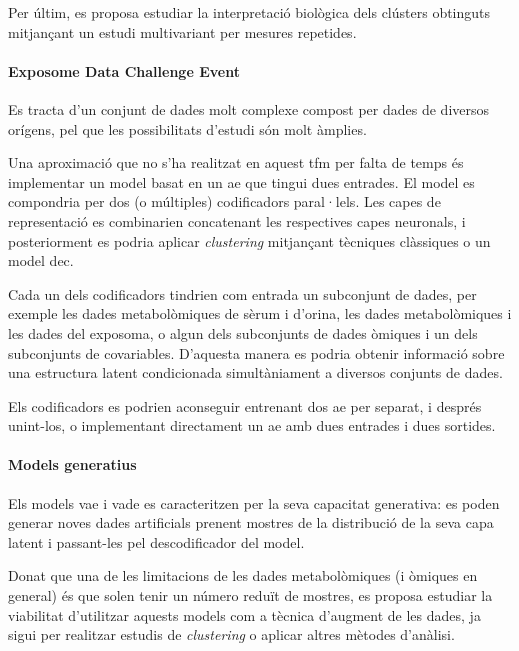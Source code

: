 \documentclass[CAT,BIB]{TFUOC}%
\begin{document}
            Per últim,
            es proposa estudiar la interpretació biològica dels clústers obtinguts
            mitjançant un estudi multivariant per mesures repetides.

        \paragraph{Exposome Data Challenge Event}
            Es tracta d'un conjunt de dades molt complexe
            compost per dades de diversos orígens,
            pel que les possibilitats d'estudi són molt àmplies.

            Una aproximació que no s'ha realitzat en aquest \gls{tfm}
            per falta de temps és
            implementar un model basat en un \gls{ae}
            que tingui dues entrades.
            El model es compondria per dos (o múltiples) codificadors paral·lels.
            Les capes de representació es combinarien concatenant
            les respectives capes neuronals,
            i posteriorment es podria aplicar \textit{clustering}
            mitjançant tècniques clàssiques o un model \gls{dec}.

            Cada un dels codificadors tindrien com entrada un subconjunt de dades,
            per exemple les dades metabolòmiques de sèrum i d'orina,
            les dades metabolòmiques i les dades del exposoma,
            o algun dels subconjunts de dades òmiques i un dels subconjunts de covariables.
            D'aquesta manera es podria obtenir informació sobre una estructura latent
            condicionada simultàniament a diversos conjunts de dades.

            Els codificadors es podrien aconseguir entrenant dos \gls{ae} per separat,
            i després unint-los,
            o implementant directament un \gls{ae} amb dues entrades i dues sortides.

        \paragraph{Models generatius}
            Els models \gls{vae} i \gls{vade} es caracteritzen
            per la seva capacitat generativa:
            es poden generar noves dades artificials
            prenent mostres de la distribució de la seva capa latent
            i passant-les pel descodificador del model.

            Donat que una de les limitacions de les dades metabolòmiques
            (i òmiques en general)
            és que solen tenir un número reduït de mostres,
            es proposa estudiar la viabilitat d'utilitzar aquests models
            com a tècnica d'augment de les dades,
            ja sigui per realitzar estudis de \textit{clustering}
            o aplicar altres mètodes d'anàlisi.
\end{document}
